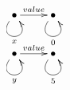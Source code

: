 $\xymatrix{
   \bullet \ar@(dl,dr)[]_{x} \ar[r]^{value} & \bullet \ar@(dl,dr)[]_{0} \\
   \bullet \ar@(dl,dr)[]_{y} \ar[r]^{value} & \bullet \ar@(dl,dr)[]_{5}
}$
